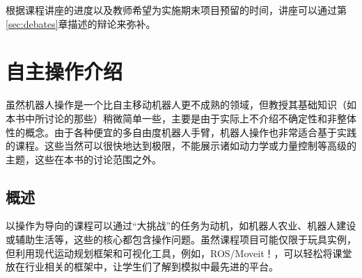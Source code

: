 
根据课程讲座的进度以及教师希望为实施期末项目预留的时间，讲座可以通过第\ref{sec:debates}章描述的辩论来弥补。


\section {自主操作介绍}
虽然机器人操作是一个比自主移动机器人更不成熟的领域，但教授其基础知识（如本书中所讨论的那些）稍微简单一些，主要是由于实际上不介绍不确定性和非整体性的概念。由于各种便宜的多自由度机器人手臂，机器人操作也非常适合基于实践的课程。这些当然可以很快地达到极限，不能展示诸如动力学或力量控制等高级的主题，这些在本书的讨论范围之外。


\subsection{概述}
以操作为导向的课程可以通过“大挑战”的任务为动机，如机器人农业、机器人建设或辅助生活等，这些的核心都包含操作问题。虽然课程项目可能仅限于玩具实例，但利用现代运动规划框架和可视化工具，例如，ROS/Moveit！，可以轻松将课堂放在行业相关的框架中，让学生们了解到模拟中最先进的平台。

